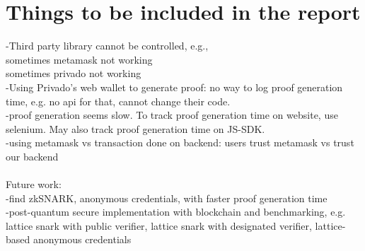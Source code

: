 \documentclass[12pt]{article}
\date{13th Dec 2024}
\theoremstyle{definition}
\begin{document}

\tableofcontents
\newpage
\section{Things to be included in the report} \label{Introduction}
-Third party library cannot be controlled, e.g., \\
sometimes metamask not working\\
sometimes privado not working\\
-Using Privado's web wallet to generate proof: no way to log proof generation time, e.g. no api for that, cannot change their code.\\
-proof generation seems slow. To track proof generation time on website, use selenium. May also track proof generation time on JS-SDK.\\
-using metamask vs transaction done on backend: users trust metamask vs trust our backend\\
\\
Future work:\\
-find zkSNARK, anonymous credentials, with faster proof generation time\\
-post-quantum secure implementation with blockchain and benchmarking, e.g. lattice snark with public verifier, lattice snark with designated verifier, lattice-based anonymous credentials\\
\end{document}
